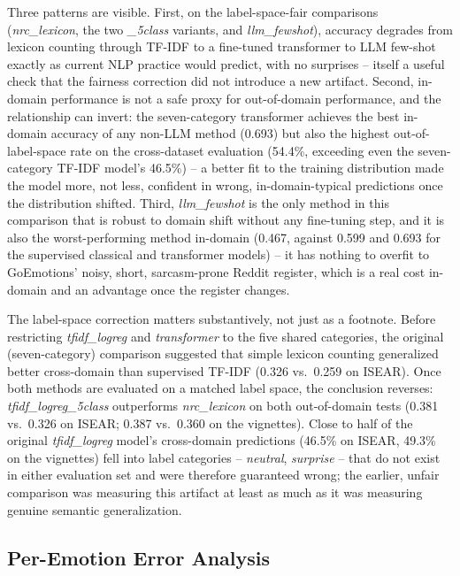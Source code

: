 \documentclass[higheredu,article,submit,pdftex,moreauthors]{Definitions/mdpi}
\begin{document}
Three patterns are visible. First, on the label-space-fair comparisons (\textit{nrc\_lexicon}, the two \textit{\_5class} variants, and \textit{llm\_fewshot}), accuracy degrades from lexicon counting through TF-IDF to a fine-tuned transformer to LLM few-shot exactly as current NLP practice would predict, with no surprises -- itself a useful check that the fairness correction did not introduce a new artifact. Second, in-domain performance is not a safe proxy for out-of-domain performance, and the relationship can invert: the seven-category transformer achieves the best in-domain accuracy of any non-LLM method (0.693) but also the highest out-of-label-space rate on the cross-dataset evaluation (54.4\%, exceeding even the seven-category TF-IDF model's 46.5\%) -- a better fit to the training distribution made the model more, not less, confident in wrong, in-domain-typical predictions once the distribution shifted. Third, \textit{llm\_fewshot} is the only method in this comparison that is robust to domain shift without any fine-tuning step, and it is also the worst-performing method in-domain (0.467, against 0.599 and 0.693 for the supervised classical and transformer models) -- it has nothing to overfit to GoEmotions' noisy, short, sarcasm-prone Reddit register, which is a real cost in-domain and an advantage once the register changes.

The label-space correction matters substantively, not just as a footnote. Before restricting \textit{tfidf\_logreg} and \textit{transformer} to the five shared categories, the original (seven-category) comparison suggested that simple lexicon counting generalized better cross-domain than supervised TF-IDF (0.326 vs.\ 0.259 on ISEAR). Once both methods are evaluated on a matched label space, the conclusion reverses: \textit{tfidf\_logreg\_5class} outperforms \textit{nrc\_lexicon} on both out-of-domain tests (0.381 vs.\ 0.326 on ISEAR; 0.387 vs.\ 0.360 on the vignettes). Close to half of the original \textit{tfidf\_logreg} model's cross-domain predictions (46.5\% on ISEAR, 49.3\% on the vignettes) fell into label categories -- \textit{neutral}, \textit{surprise} -- that do not exist in either evaluation set and were therefore guaranteed wrong; the earlier, unfair comparison was measuring this artifact at least as much as it was measuring genuine semantic generalization.

\subsection{Per-Emotion Error Analysis}
\end{document}
